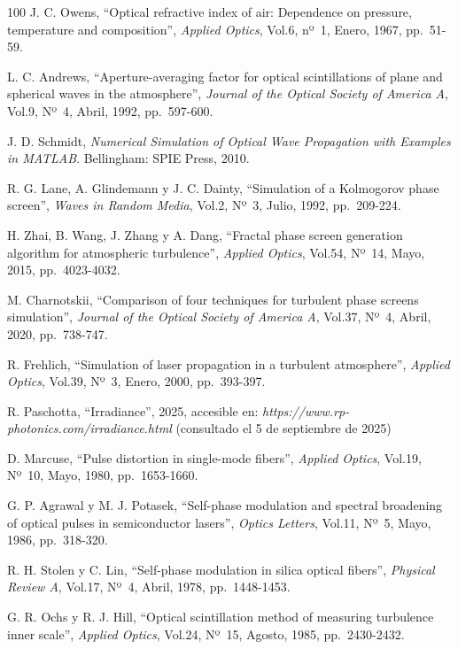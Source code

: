 \begin{thebibliography}{100}
J. C. Owens,
``Optical refractive index of air: Dependence on pressure, temperature and composition'',
\textit{Applied Optics},
Vol.6, nº~1, Enero, 1967, pp.~51-59.

L. C. Andrews,
``Aperture-averaging factor for optical scintillations of plane and spherical waves in the atmosphere'',
\textit{Journal of the Optical Society of America A},
Vol.9, Nº~4, Abril, 1992, pp.~597-600.

J. D. Schmidt,
\textit{Numerical Simulation of Optical Wave Propagation with Examples in MATLAB}.
Bellingham: SPIE Press, 2010.

R. G. Lane, A. Glindemann y J. C. Dainty,
``Simulation of a Kolmogorov phase screen'',
\textit{Waves in Random Media},
Vol.2, Nº~3, Julio, 1992, pp.~209-224.


H. Zhai, B. Wang, J. Zhang y A. Dang,
``Fractal phase screen generation algorithm for atmospheric turbulence'',
\textit{Applied Optics},
Vol.54, Nº~14, Mayo, 2015, pp.~4023-4032.

M. Charnotskii,
``Comparison of four techniques for turbulent phase screens simulation'',
\textit{Journal of the Optical Society of America A},
Vol.37, Nº~4, Abril, 2020, pp.~738-747.

R. Frehlich,
``Simulation of laser propagation in a turbulent atmosphere'',
\textit{Applied Optics},
Vol.39, Nº~3, Enero, 2000, pp.~393-397.

R. Paschotta,
``Irradiance'',
2025, accesible en: \textit{https://www.rp-photonics.com/irradiance.html}
(consultado el 5 de septiembre de 2025)

D. Marcuse,
``Pulse distortion in single-mode fibers'',
\textit{Applied Optics},
Vol.19, Nº~10, Mayo, 1980, pp.~1653-1660.

G. P. Agrawal y M. J. Potasek,
``Self-phase modulation and spectral broadening of optical pulses in semiconductor lasers'',
\textit{Optics Letters},
Vol.11, Nº~5, Mayo, 1986, pp.~318-320.


R. H. Stolen y C. Lin,
``Self-phase modulation in silica optical fibers'',
\textit{Physical Review A},
Vol.17, Nº~4, Abril, 1978, pp.~1448-1453.

G. R. Ochs y R. J. Hill,
``Optical scintillation method of measuring turbulence inner scale'',
\textit{Applied Optics},
Vol.24, Nº~15, Agosto, 1985, pp.~2430-2432.


\end{thebibliography}
